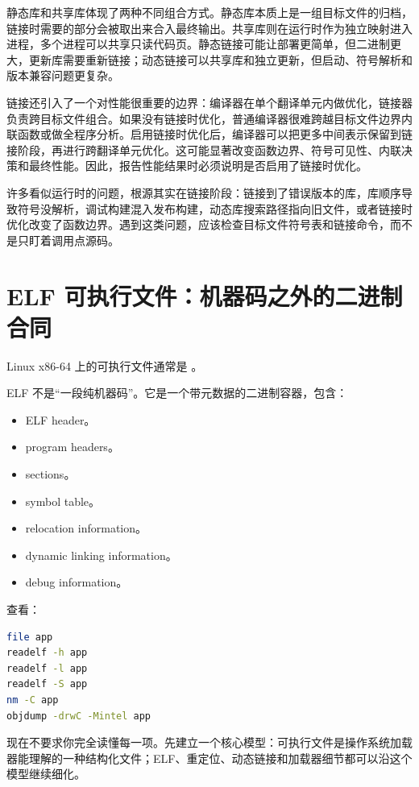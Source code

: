 静态库和共享库体现了两种不同组合方式。静态库本质上是一组目标文件的归档，链接时需要的部分会被取出来合入最终输出。共享库则在运行时作为独立映射进入进程，多个进程可以共享只读代码页。静态链接可能让部署更简单，但二进制更大，更新库需要重新链接；动态链接可以共享库和独立更新，但启动、符号解析和版本兼容问题更复杂。

链接还引入了一个对性能很重要的边界：编译器在单个翻译单元内做优化，链接器负责跨目标文件组合。如果没有链接时优化，普通编译器很难跨越目标文件边界内联函数或做全程序分析。启用链接时优化后，编译器可以把更多中间表示保留到链接阶段，再进行跨翻译单元优化。这可能显著改变函数边界、符号可见性、内联决策和最终性能。因此，报告性能结果时必须说明是否启用了链接时优化。

\begin{deepdive}
许多看似运行时的问题，根源其实在链接阶段：链接到了错误版本的库，库顺序导致符号没解析，调试构建混入发布构建，动态库搜索路径指向旧文件，或者链接时优化改变了函数边界。遇到这类问题，应该检查目标文件符号表和链接命令，而不是只盯着调用点源码。
\end{deepdive}

\section{ELF 可执行文件：机器码之外的二进制合同}

Linux x86-64 上的可执行文件通常是 。

ELF 不是“一段纯机器码”。它是一个带元数据的二进制容器，包含：

\begin{itemize}
  \item ELF header。
  \item program headers。
  \item sections。
  \item symbol table。
  \item relocation information。
  \item dynamic linking information。
  \item debug information。
\end{itemize}

查看：

\begin{lstlisting}[language=bash]
file app
readelf -h app
readelf -l app
readelf -S app
nm -C app
objdump -drwC -Mintel app
\end{lstlisting}

现在不要求你完全读懂每一项。先建立一个核心模型：可执行文件是操作系统加载器能理解的一种结构化文件；ELF、重定位、动态链接和加载器细节都可以沿这个模型继续细化。

